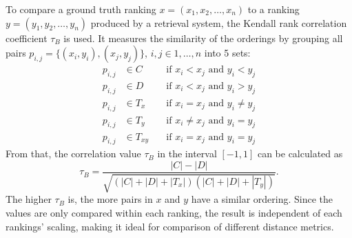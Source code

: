 To compare a ground truth ranking $x = (x_1, x_2, \dots, x_n)$ to a ranking
$y = (y_1, y_2, \dots, y_n)$ produced by a retrieval system, the Kendall
rank correlation coefficient $\tau_B$ is used. It measures the similarity of
the orderings by grouping all pairs $p_{i, j} = \{(x_i, y_i), (x_j, y_j)\}$,
$i, j \in 1, \dots, n$ into 5 sets:
\begin{align*}
    p_{i, j} & \in C & \quad\text{if } x_i < x_j \text{ and } y_i < y_j \\
    p_{i, j} & \in D & \quad\text{if } x_i < x_j \text{ and } y_i > y_j \\
    p_{i, j} & \in T_x & \quad\text{if } x_i = x_j \text{ and } y_i \neq y_j \\
    p_{i, j} & \in T_y & \quad\text{if } x_i \neq x_j \text{ and } y_i = y_j \\
    p_{i, j} & \in T_{xy} & \quad\text{if } x_i = x_j \text{ and } y_i = y_j
\end{align*}
From that, the correlation value $\tau_B$ in the interval $[-1, 1]$ can be
calculated as
\begin{equation*}
    \tau_B = \frac{|C| - |D|}{\sqrt{(|C| + |D| + |T_x|)(|C| + |D| + |T_y|)}}.
\end{equation*}
The higher $\tau_B$ is, the more pairs in $x$ and $y$ have a similar ordering.
Since the values are only compared within each ranking, the result is
independent of each rankings' scaling, making it ideal for comparison of
different distance metrics.
